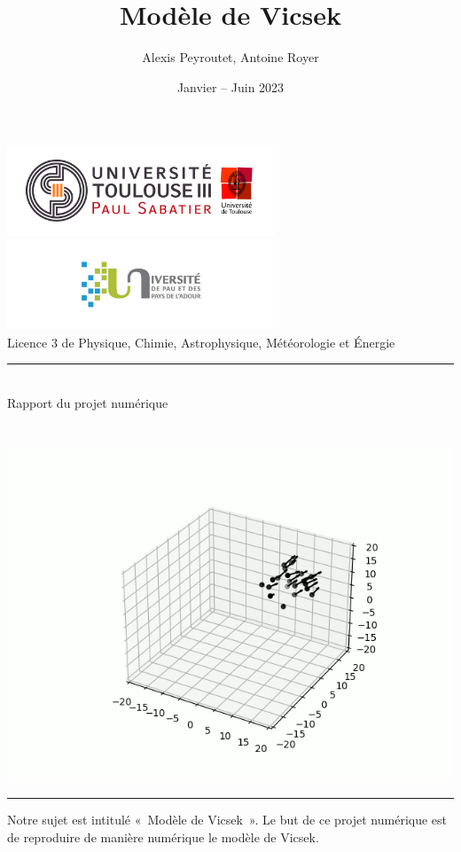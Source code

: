 \documentclass[french, a4paper, 12pt, openany]{report}
\title{\sc Modèle de Vicsek}
\author{Alexis Peyroutet, Antoine Royer}
\date{Janvier – Juin 2023}
\begin{document}
\makeatletter
\begin{titlepage}
	\centering
	
	\includegraphics[width=8cm]{images/ut3.png} \hfill \includegraphics[width=8cm]{images/uppa.png} \\
	{\large{\sc Licence 3 de Physique, Chimie, Astrophysique, Météorologie et Énergie}} \\
	\rule{0.5\linewidth}{0.4pt} \\
	{\sc Rapport du projet numérique} \\
	
	
	\vfill
	{\huge {\sc \@title}} \\ \vspace{1cm}
	{\Large \@author} \\
	
	\vfill 
	\includegraphics[width=0.7\linewidth]{images/page_garde2.png}
	\vfill
	{\Large \@date}
	\rule{\linewidth}{0.4pt}
\end{titlepage}
\makeatother

\tableofcontents



	Notre sujet est intitulé «~Modèle de Vicsek~». Le but de ce projet numérique est de reproduire de manière numérique le modèle de Vicsek.
\end{document}
